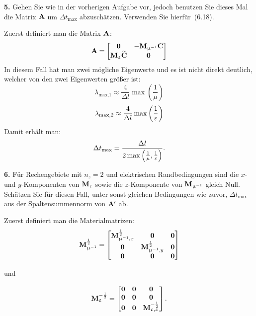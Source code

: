 \documentclass[Protokollheft.tex]{subfiles}
\begin{document}
\begin{framed}
	\noindent \textbf{5.} Gehen Sie wie in der vorherigen Aufgabe vor, jedoch benutzen Sie
    dieses Mal die Matrix $ \mathbf{A} $ um $\Delta t_{\text{max}}$ abzuschätzen. Verwenden Sie hierfür~(6.18).\label{exer:approxEVofA}
\end{framed}
\noindent
Zuerst definiert man die Matrix $ \mathbf{A} $:
$$ \mathbf{A} =\begin{bmatrix}
\boldsymbol{0} & -\mathbf{M}_{\upmu^{-1}}\mathbf{C}\\
\mathbf{M}_{\upvarepsilon}\widetilde{\mathbf{C}} & \boldsymbol{0}
\end{bmatrix} $$
\noindent
In diesem Fall hat man zwei mögliche Eigenwerte und es ist nicht direkt deutlich, welcher von den zwei Eigenwerten größer ist:
$$\lambda_{\text{max,1}} \approx \frac{4}{\Delta l}\max\left(\frac{1}{\mu}\right) $$
$$\lambda_{\text{max,2}} \approx \frac{4}{\Delta l}\max\left(\frac{1}{\varepsilon}\right) $$
\noindent
Damit erhält man:
$$\Delta t_{\text{max}}=\frac{\Delta l}{2\max\left(\frac{1}{\mu},\frac{1}{\varepsilon}\right)}.$$




\begin{framed}
	\noindent \textbf{6.} Für Rechengebiete mit $n_z=2$ und elektrischen
    Randbedingungen sind die $x$- und $y$-Komponenten von $\mathbf{M}_{\upvarepsilon}$ sowie die
    $z$-Komponente von $\mathbf{M}_{\upmu^{-1}}$ gleich Null. Schätzen Sie für diesen Fall,
    unter sonst gleichen Bedingungen wie zuvor, $\Delta t_{\text{max}}$ aus
    der Spaltensummennorm von $ \mathbf{A} '$ ab.\label{exer:approxDeltaTmax}
\end{framed}

Zuerst definiert man die Materialmatrizen:
$$\mathbf{M}_{\upmu^{-1}}^\frac12 = \begin{bmatrix}
\mathbf{M}^{\frac12}_{\upmu^{-1},x} & \boldsymbol{0} &\boldsymbol{0}\\
\boldsymbol{0} & \mathbf{M}^{\frac12}_{\upmu^{-1},y} & \boldsymbol{0} \\
\boldsymbol{0} & \boldsymbol{0} & \boldsymbol{0}
\end{bmatrix} $$

und

$$\mathbf{M}_{\upvarepsilon}^{-\frac12} = \begin{bmatrix}
\boldsymbol{0} & \boldsymbol{0} & \boldsymbol{0}\\
\boldsymbol{0} & \boldsymbol{0} & \boldsymbol{0}\\
\boldsymbol{0} & \boldsymbol{0} & \mathbf{M}^{-\frac12}_{\upvarepsilon, z}
\end{bmatrix}.$$
\end{document}
